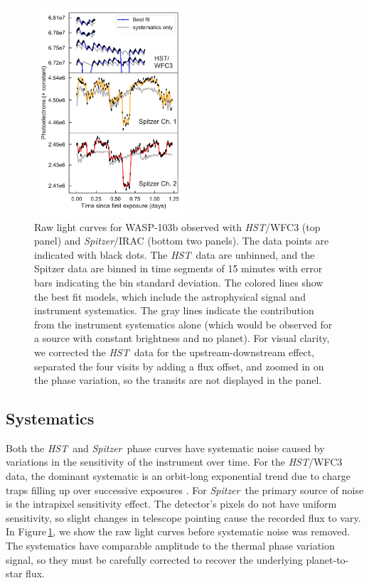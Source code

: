 \documentclass[twocolumn]{aastex61}
\newcommand{\project}[1]{\textsl{#1}}
\newcommand{\HST}{\project{HST}}
\newcommand{\Spitzer}{\project{Spitzer}}
\begin{document}
\begin{figure}
\includegraphics[width = 0.5\textwidth]{Figures/systematics.pdf}
\caption{Raw light curves for WASP-103b observed with \HST/WFC3 (top panel) and \Spitzer/IRAC (bottom two panels). The data points are indicated with black dots. The \HST\ data are unbinned, and the Spitzer data are binned in time segments of 15 minutes with error bars indicating the bin standard deviation. The colored lines show the best fit models, which include the astrophysical signal and instrument systematics. The gray lines indicate the contribution from the instrument systematics alone (which would be observed for a source with constant brightness and no planet). For visual clarity, we corrected the \HST\ data for the upstream-downstream effect, separated the four visits by adding a flux offset, and zoomed in on the phase variation, so the transits are not displayed in the panel.}
\label{fig:systematics}
\end{figure}


\subsection{Systematics}
Both the \HST\ and \Spitzer\ phase curves have systematic noise caused by variations in the sensitivity of the instrument over time. For the \HST/WFC3 data, the dominant systematic is an orbit-long exponential trend due to charge traps filling up over successive exposures \citep{long15, zhou17}. For \Spitzer\, the primary source of noise is the intrapixel sensitivity effect. The detector's pixels do not have uniform sensitivity, so slight changes in telescope pointing cause the recorded flux to vary. In Figure\,\ref{fig:systematics}, we show the raw light curves before systematic noise was removed. The systematics have comparable amplitude to the thermal phase variation signal, so they must be carefully corrected to recover the underlying planet-to-star flux. 
\end{document}
